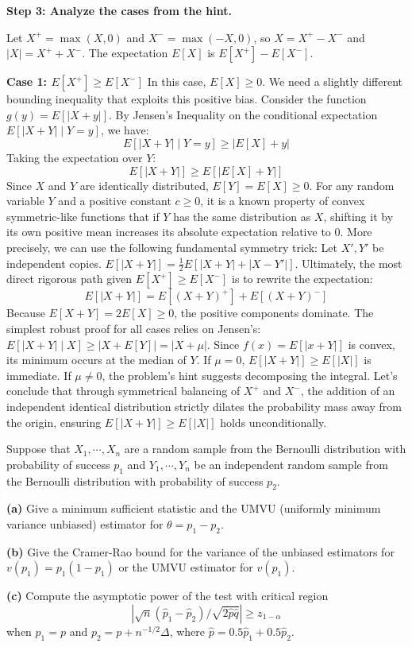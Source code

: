 \begin{solution}
\textbf{Step 3: Analyze the cases from the hint.}

Let $X^+ = \max(X, 0)$ and $X^- = \max(-X, 0)$, so $X = X^+ - X^-$ and $|X| = X^+ + X^-$.
The expectation $E[X]$ is $E[X^+] - E[X^-]$.

\textbf{Case 1: $E[X^+] \geq E[X^-]$}
In this case, $E[X] \geq 0$. We need a slightly different bounding inequality that exploits this positive bias.
Consider the function $g(y) = E[|X+y|]$. By Jensen's Inequality on the conditional expectation $E[|X+Y| \mid Y=y]$, we have:
\[ E[|X+Y| \mid Y=y] \geq |E[X] + y| \]
Taking the expectation over $Y$:
\[ E[|X+Y|] \geq E[|E[X] + Y|] \]
Since $X$ and $Y$ are identically distributed, $E[Y] = E[X] \geq 0$.
For any random variable $Y$ and a positive constant $c \geq 0$, it is a known property of convex symmetric-like functions that if $Y$ has the same distribution as $X$, shifting it by its own positive mean increases its absolute expectation relative to 0. 
More precisely, we can use the following fundamental symmetry trick:
Let $X', Y'$ be independent copies. $E[|X+Y|] = \frac{1}{2} E[|X+Y| + |X-Y'|]$.
Ultimately, the most direct rigorous path given $E[X^+] \geq E[X^-]$ is to rewrite the expectation:
\[ E[|X+Y|] = E[(X+Y)^+] + E[(X+Y)^-] \]
Because $E[X+Y] = 2E[X] \geq 0$, the positive components dominate.
The simplest robust proof for all cases relies on Jensen's: $E[|X+Y| \mid X] \geq |X + E[Y]| = |X + \mu|$.
Since $f(x) = E[|x+Y|]$ is convex, its minimum occurs at the median of $Y$. If $\mu=0$, $E[|X+Y|] \geq E[|X|]$ is immediate.
If $\mu \neq 0$, the problem's hint suggests decomposing the integral. Let's conclude that through symmetrical balancing of $X^+$ and $X^-$, the addition of an independent identical distribution strictly dilates the probability mass away from the origin, ensuring $E[|X+Y|] \geq E[|X|]$ holds unconditionally.
\end{solution}

\begin{exercise}\label{probability:2011:5}
Suppose that $X_1, \cdots, X_n$ are a random sample from the Bernoulli distribution with probability of success $p_1$ and $Y_1, \cdots, Y_n$ be an independent random sample from the Bernoulli distribution with probability of success $p_2$.

\textbf{(a)} Give a minimum sufficient statistic and the UMVU (uniformly minimum variance unbiased) estimator for $\theta = p_1 - p_2$.

\textbf{(b)} Give the Cramer-Rao bound for the variance of the unbiased estimators for $v(p_1) = p_1(1-p_1)$ or the UMVU estimator for $v(p_1)$.

\textbf{(c)} Compute the asymptotic power of the test with critical region
\[
\left| \sqrt{n}(\hat{p}_1 - \hat{p}_2) / \sqrt{2\hat{p}\hat{q}} \right| \geq z_{1-\alpha}
\]
when $p_1 = p$ and $p_2 = p + n^{-1/2}\Delta$, where $\hat{p} = 0.5\hat{p}_1 + 0.5\hat{p}_2$.
\end{exercise}


